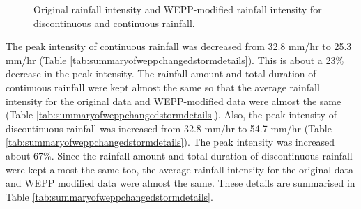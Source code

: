 \begin{figure}[htbp]
  \centering
  \caption{Original rainfall intensity and WEPP-modified rainfall intensity for
discontinuous and continuous rainfall.}
  \label{fig:intensity_discontinuous_and_continuous}
\end{figure}

The peak intensity of continuous rainfall was decreased from 32.8 mm/hr to 25.3
mm/hr (Table \ref{tab:summaryofweppchangedstormdetails}). This is about a 23\%
decrease in the peak intensity. The rainfall amount and total duration of
continuous rainfall were kept almost the same so that the average rainfall
intensity for the original data and WEPP-modified data were almost the same
(Table \ref{tab:summaryofweppchangedstormdetails}).
Also, the peak intensity of discontinuous rainfall was increased from 32.8 mm/hr
to 54.7 mm/hr (Table \ref{tab:summaryofweppchangedstormdetails}). The peak
intensity was increased about 67\%. Since the rainfall amount and total duration
of discontinuous rainfall were kept almost the same too, the average rainfall
intensity for the original data and WEPP modified data were almost the same.
These details are summarised in Table
\ref{tab:summaryofweppchangedstormdetails}.

